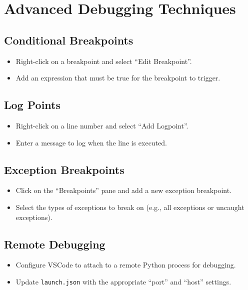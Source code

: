 \documentclass[
  letterpaper,
  DIV=11,
  numbers=noendperiod]{scrreprt}
\providecommand{\tightlist}{%
  \setlength{\itemsep}{0pt}\setlength{\parskip}{0pt}}\usepackage{longtable,booktabs,array}
\begin{document}
\section{Advanced Debugging
Techniques}\label{advanced-debugging-techniques}

\subsection{Conditional Breakpoints}\label{conditional-breakpoints}

\begin{itemize}
\tightlist
\item
  Right-click on a breakpoint and select ``Edit Breakpoint''.
\item
  Add an expression that must be true for the breakpoint to trigger.
\end{itemize}

\subsection{Log Points}\label{log-points}

\begin{itemize}
\tightlist
\item
  Right-click on a line number and select ``Add Logpoint''.
\item
  Enter a message to log when the line is executed.
\end{itemize}

\subsection{Exception Breakpoints}\label{exception-breakpoints}

\begin{itemize}
\tightlist
\item
  Click on the ``Breakpoints'' pane and add a new exception breakpoint.
\item
  Select the types of exceptions to break on (e.g., all exceptions or
  uncaught exceptions).
\end{itemize}

\subsection{Remote Debugging}\label{remote-debugging}

\begin{itemize}
\tightlist
\item
  Configure VSCode to attach to a remote Python process for debugging.
\item
  Update \texttt{launch.json} with the appropriate ``port'' and ``host''
  settings.
\end{itemize}
\end{document}
